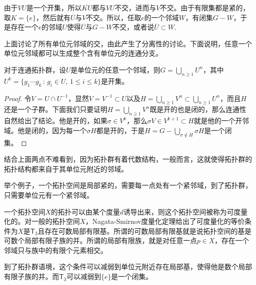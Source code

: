 由于$VU$是一个开集，所以$\overline{KU}$都与$VU$不交，进而与$V$不交。由于有限集都是紧的，取$K=\{e\}$，然后就有$\overline{U}$与$V$不交。所以，任取$e$的一个邻域$W$，有闭集$G-W$，于是存在一个$e$的邻域$U$使得$\overline{U}$与$G-W$不交，或者说$\overline{U}\subset W$.

上面讨论了所有单位元邻域的交，由此产生了分离性的讨论。下面说明，任意一个单位元邻域都可以生成整个含有单位元的连通分支。

\begin{lem}\label{lem:116}
对于连通拓扑群，设$U$是单位元的任意一个邻域，则$G=\bigcup_{n\geq 1}U^n$，其中$U^k=\{g_1\cdots g_k\,:\,g_i\in U,\, 1\leq i \leq k\}$是开集。
\end{lem}

\begin{proof}
令$V=U\cap U^{-1}$，显然$V=V^{-1}\subset U$以及$H=\bigcup_{n\geq 1}V^n\subset \bigcup_{n\geq 1}U^n$，而且$H$还是一个子群。下面我们只要证明$H=\bigcup_{n\geq 1}V^n$既是开的也是闭的，那么连通性自然给出了结论。他是开的，如果$\sigma\in V^k$，那么$\sigma V\in V^{k+1}\subset H$就是他的一个开邻域。他是闭的，因为每一个$\sigma H$都是开的，于是$H=G-\bigcup_{\sigma\notin H}\sigma H$是一个闭集。
\end{proof}

结合上面两点不难看到，因为拓扑群有着代数结构，一般而言，这就使得拓扑群的拓扑结构都来自于其单位元附近的邻域。

举个例子，一个拓扑空间是局部紧的，需要每一点处有一个紧邻域，到了拓扑群，只需要单位元有一个紧邻域。

\begin{para}
一个拓扑空间$X$的拓扑可以由某个度量$d$诱导出来，则这个拓扑空间被称为可度量化的。对一般的拓扑空间$X$，Nagata-Smirnov度量化定理给出了可度量化的等价条件为$X$是$\mathsf{T}_3$且存在可数局部有限基。所谓的可数局部有限基就是说拓扑空间的基是可数个局部有限子族的并。所谓的局部有限族，就是对任意一点$p\in X$，存在一个邻域只与族中的有限个元素相交。

到了拓扑群语境，这个条件可以减弱到单位元附近存在局部基，使得他是数个局部有限子族的并。而$\mathsf{T}_3$可以减弱到$\{e\}$是一个闭集。
\end{para}

